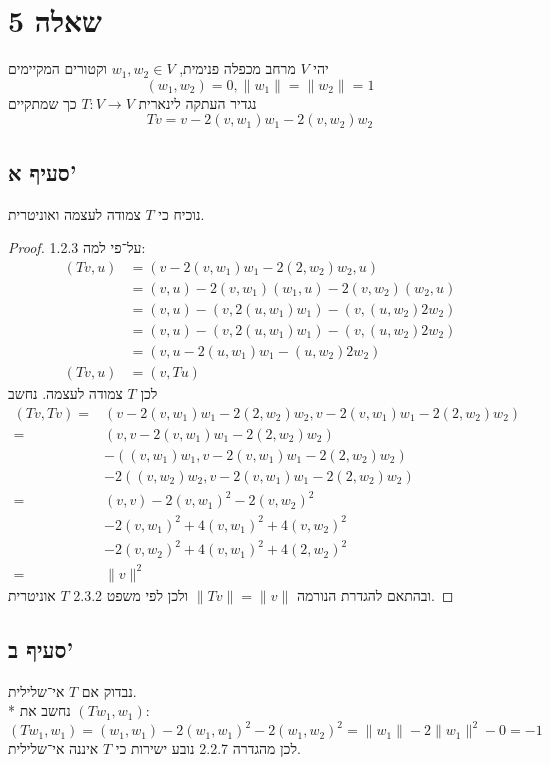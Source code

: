 \section{שאלה 5}
יהי $V$ מרחב מכפלה פנימית, $w_1, w_2 \in V$ וקטורים המקיימים
\[
	(w_1, w_2) = 0, \lVert w_1 \rVert = \lVert w_2 \rVert = 1
\]
נגדיר העתקה לינארית $T: V \to V$ כך שמתקיים
\[
	Tv = v - 2(v, w_1) w_1 - 2(v, w_2) w_2
\]

\subsection{סעיף א'}
נוכיח כי $T$ צמודה לעצמה ואוניטרית.
\begin{proof}
	על־פי למה 1.2.3:
	\begin{align*}
		(T v, u)
		& = (v - 2(v, w_1) w_1 - 2(2, w_2) w_2, u) \\
		& = (v, u) - 2 (v, w_1) (w_1, u) - 2(v, w_2) (w_2, u) \\
		& = (v, u) - (v, 2 (u, w_1) w_1) - (v, (u, w_2) 2w_2) \\
		& = (v, u) - (v, 2 (u, w_1) w_1) - (v, (u, w_2) 2w_2) \\
		& = (v, u - 2 (u, w_1) w_1 - (u, w_2) 2w_2) \\
		(T v, u) & = (v, T u)
	\end{align*}
	לכן $T$ צמודה לעצמה. \*
	נחשב
	\begin{align*}
		(T v, T v)
		= & (v - 2(v, w_1) w_1 - 2(2, w_2) w_2, v - 2(v, w_1) w_1 - 2(2, w_2) w_2) \\
		= & (v, v - 2(v, w_1) w_1 - 2(2, w_2) w_2) \\
		& - ((v, w_1) w_1, v - 2(v, w_1) w_1 - 2(2, w_2) w_2) \\
		& - 2((v, w_2) w_2, v - 2(v, w_1) w_1 - 2(2, w_2) w_2) \\
		= & (v, v) - 2 {(v, w_1)}^2 - 2{(v, w_2)}^2 \\
		& - 2{(v, w_1)}^2 + 4{(v, w_1)}^2  + 4{(v, w_2)}^2 \\
		& - 2{(v, w_2)}^2 + 4{(v, w_1)}^2 + 4{(2, w_2)}^2 \\
		= & \lVert v\rVert^2
	\end{align*}
	ובהתאם להגדרת הנורמה $\lVert T v \rVert = \lVert v \rVert$ ולכן לפי משפט 2.3.2 $T$ אוניטרית.
\end{proof}

\subsection{סעיף ב'}
נבדוק אם $T$ אי־שלילית. \\*
נחשב את $(T w_1, w_1)$:
\[
	(T w_1, w_1)
	= (w_1, w_1) - 2 {(w_1, w_1)}^2 - 2{(w_1, w_2)}^2
	= \lVert w_1 \rVert - 2\lVert w_1 \rVert^2 - 0
	= -1
\]
לכן מהגדרה 2.2.7 נובע ישירות כי $T$ איננה אי־שלילית.


